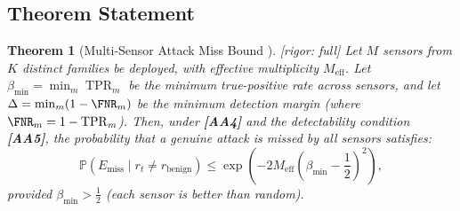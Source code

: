 \documentclass[11pt,a4paper]{article}
\newtheorem{theorem}{Theorem}[section]
\theoremstyle{definition}
\theoremstyle{remark}
\newcommand{\rigorFull}{\textcolor{green!60!black}{[rigor: full]}}
\newcommand{\assumptionTag}[1]{\textsf{\textbf{[A#1]}}}
\DeclareMathOperator{\TPR}{TPR}
\newcommand{\Pbb}{\mathbb{P}}
\begin{document}
\subsection{Theorem Statement}

\begin{theorem}[Multi-Sensor Attack Miss Bound ]
\label{thm:miss_bound}
\rigorFull
Let $M$ sensors from $K$ distinct families be deployed, with effective multiplicity $M_{\mathrm{eff}}$. Let $\beta_{\min} = \min_m \TPR_m$ be the minimum true-positive rate across sensors, and let $\Delta = \min_m (1 - \FNR_m)$ be the minimum detection margin (where $\FNR_m = 1 - \TPR_m$). Then, under \assumptionTag{A4} and the detectability condition \assumptionTag{A5}, the probability that a genuine attack is missed by all sensors satisfies:
\begin{equation}
\Pbb(E_{\mathrm{miss}} \mid r_t \neq r_{\mathrm{benign}}) \leq \exp\!\left( -2 M_{\mathrm{eff}} (\beta_{\min} - \frac{1}{2})^2 \right),
\label{eq:miss_bound}
\end{equation}
provided $\beta_{\min} > \frac{1}{2}$ (each sensor is better than random).
\end{theorem}
\end{document}
